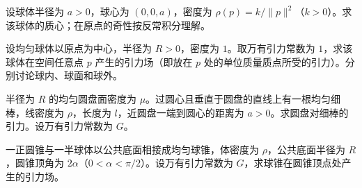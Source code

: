 \noindent\begin{minipage}{\textwidth}
设球体半径为 $a>0$，球心为 $(0,0,a)$，密度为 $\rho(p)=k/\|p\|^2$（$k>0$）。求该球体的质心；在原点的奇性按反常积分理解。
\end{minipage}\par\vfill
\noindent\begin{minipage}{\textwidth}
设均匀球体以原点为中心，半径为 $R>0$，密度为 $1$。取万有引力常数为 $1$，求该球体在空间任意点 $p$ 产生的引力场（即放在 $p$ 处的单位质量质点所受的引力）。分别讨论球内、球面和球外。
\end{minipage}\par\vfill
\newpage
\noindent\begin{minipage}{\textwidth}
半径为 $R$ 的均匀圆盘面密度为 $\mu$。过圆心且垂直于圆盘的直线上有一根均匀细棒，线密度为 $\rho$，长度为 $l$，近圆盘一端到圆心的距离为 $a>0$。求圆盘对细棒的引力。设万有引力常数为 $G$。
\end{minipage}\par\vfill
\noindent\begin{minipage}{\textwidth}
一正圆锥与一半球体以公共底面相接成均匀球锥，体密度为 $\rho$，公共底面半径为 $R$，圆锥顶角为 $2\alpha$（$0<\alpha<\pi/2$）。设万有引力常数为 $G$，求球锥在圆锥顶点处产生的引力场。
\end{minipage}\par\vfill
